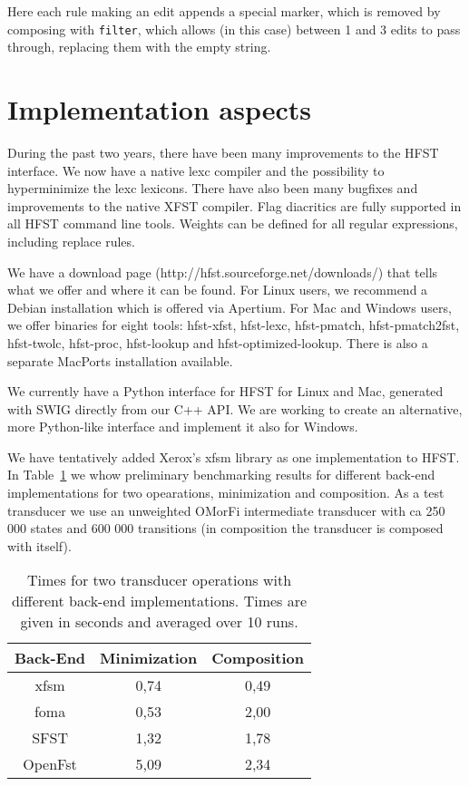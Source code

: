 \documentclass{llncs}
\begin{document}
Here each rule making an edit appends a special marker, which is removed
by composing with \verb+filter+, which allows (in this case) between 1 and 3
edits to pass through, replacing them with the empty string.

\section{Implementation aspects}\label{sec:background}
During the past two years, there have been many improvements to the HFST 
interface. We now have a native lexc compiler and the possibility to 
hyperminimize the lexc lexicons. There have also been many bugfixes and 
improvements to the native XFST compiler. Flag diacritics are fully supported 
in all HFST command line tools. Weights can be defined for all regular expressions,
including replace rules.

We have a download page (http://hfst.sourceforge.net/downloads/) that tells what 
we offer and where it can be found. For Linux users, we recommend a Debian installation
which is offered via Apertium. For Mac and Windows users,
we offer binaries for eight tools: hfst-xfst, hfst-lexc, hfst-pmatch,
hfst-pmatch2fst, hfst-twolc, hfst-proc, hfst-lookup and hfst-optimized-lookup.
There is also a separate MacPorts installation available.

We currently have a Python interface for HFST for Linux and Mac, generated with SWIG directly
from our C++ API. We are working to create an alternative, more Python-like interface
and implement it also for Windows.

We have tentatively added Xerox's xfsm library as one implementation to HFST.
In Table~\ref{operationtimes} we whow preliminary benchmarking results for different back-end
implementations for two opearations, minimization and composition. As a test transducer we use an 
unweighted OMorFi intermediate transducer with ca 250 000 states and 600 000 transitions (in composition
the transducer is composed with itself).

\begin{table}[h!]
  \centering
  \caption{Times for two transducer operations with different back-end implementations.
    Times are given in seconds and averaged over 10 runs.}
  \begin{tabular}{c c c }
    \hline
    Back-End & Minimization & Composition \\ \hline
    xfsm & 0,74 & 0,49 \\
    foma & 0,53 & 2,00 \\
    SFST & 1,32 & 1,78 \\
    OpenFst & 5,09 & 2,34 \\ \hline
  \end{tabular}
  \label{operationtimes}
\end{table}
\end{document}

